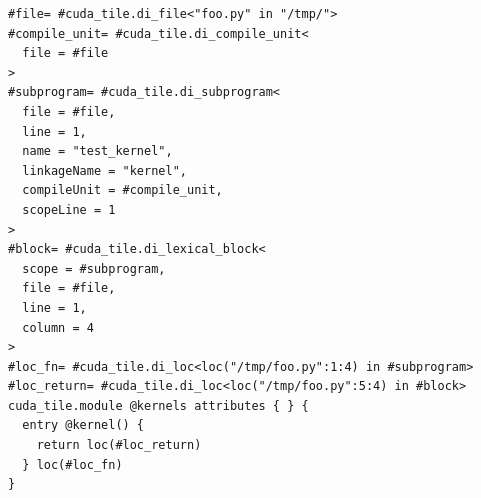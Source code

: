 \documentclass{article}
\begin{document}
\begin{lstlisting}
#file= #cuda_tile.di_file<"foo.py" in "/tmp/">
#compile_unit= #cuda_tile.di_compile_unit<
  file = #file
>
#subprogram= #cuda_tile.di_subprogram<
  file = #file,
  line = 1,
  name = "test_kernel",
  linkageName = "kernel",
  compileUnit = #compile_unit,
  scopeLine = 1
>
#block= #cuda_tile.di_lexical_block<
  scope = #subprogram,
  file = #file,
  line = 1,
  column = 4
>
#loc_fn= #cuda_tile.di_loc<loc("/tmp/foo.py":1:4) in #subprogram>
#loc_return= #cuda_tile.di_loc<loc("/tmp/foo.py":5:4) in #block>
cuda_tile.module @kernels attributes { } {
  entry @kernel() {
    return loc(#loc_return)
  } loc(#loc_fn)
}
\end{lstlisting}

\newpage
\end{document}
